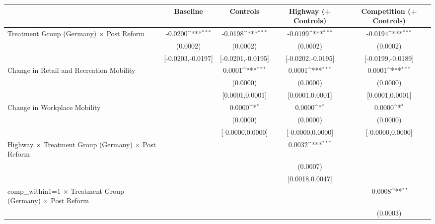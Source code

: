 {
\def\sym#1{\ifmmode^{#1}\else\(^{#1}\)\fi}
\begin{tabular}{l*{4}{c}}
\toprule
                    &\multicolumn{1}{c}{Baseline}&\multicolumn{1}{c}{Controls}&\multicolumn{1}{c}{Highway (+ Controls)}&\multicolumn{1}{c}{Competition (+ Controls)}\\
\midrule
Treatment Group (Germany) $\times$ Post Reform&     -0.0200\sym{***}&     -0.0198\sym{***}&     -0.0199\sym{***}&     -0.0194\sym{***}\\
                    &    (0.0002)         &    (0.0002)         &    (0.0002)         &    (0.0002)         \\
                    &[-0.0203,-0.0197]         &[-0.0201,-0.0195]         &[-0.0202,-0.0195]         &[-0.0199,-0.0189]         \\
Change in Retail and Recreation Mobility&                     &      0.0001\sym{***}&      0.0001\sym{***}&      0.0001\sym{***}\\
                    &                     &    (0.0000)         &    (0.0000)         &    (0.0000)         \\
                    &                     &[0.0001,0.0001]         &[0.0001,0.0001]         &[0.0001,0.0001]         \\
Change in Workplace Mobility&                     &      0.0000\sym{*}  &      0.0000\sym{*}  &      0.0000\sym{*}  \\
                    &                     &    (0.0000)         &    (0.0000)         &    (0.0000)         \\
                    &                     &[-0.0000,0.0000]         &[-0.0000,0.0000]         &[-0.0000,0.0000]         \\
Highway $\times$ Treatment Group (Germany) $\times$ Post Reform&                     &                     &      0.0032\sym{***}&                     \\
                    &                     &                     &    (0.0007)         &                     \\
                    &                     &                     &[0.0018,0.0047]         &                     \\
comp\_within1=1 $\times$ Treatment Group (Germany) $\times$ Post Reform&                     &                     &                     &     -0.0008\sym{**} \\
                    &                     &                     &                     &    (0.0003)         \\

\end{tabular}}
